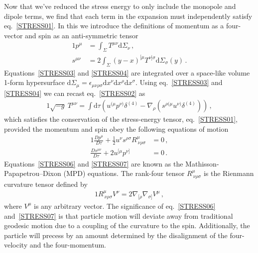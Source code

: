 Now that we've reduced the stress energy to only include the monopole and dipole terms, we find that each term in the expansion must independently satisfy eq.~\eqref{STRESS01}. In this we introduce the definitions of momentum as a four-vector and spin as an anti-symmetric tensor
\begin{alignat}{1}
  \label{STRESS03} p^{\mu}&=\int_{\Sigma}T^{\mu\nu}\mathrm{d}\Sigma_{\nu}\,,\\
  \label{STRESS04} s^{\mu\nu}&=2\int_{\Sigma}(y-x)^{[\mu}T^{\nu]\sigma}\mathrm{d}\Sigma_{\sigma}(y)\,.
\end{alignat}
Equations~\eqref{STRESS03} and \eqref{STRESS04} are integrated over a space-like volume 1-form hypersurface $\mathrm{d}\Sigma_{\mu}=\epsilon_{\mu\nu\rho\sigma}\mathrm{d}x^{\nu}\mathrm{d}x^{\rho}\mathrm{d}x^{\sigma}$. Using eq.~\eqref{STRESS03} and \eqref{STRESS04} we can recast eq.~\eqref{STRESS02} as
\begin{alignat}{1}
  \label{STRESS05} \sqrt{-g}\ T^{\mu\nu}=\int\mathrm{d}\tau\left(u^{(\mu}p^{\nu)}\delta^{(4)}-\nabla_{\rho}\left(s^{\rho(\mu}u^{\nu)}\delta^{(4)}\right)\right)\,,
\end{alignat}
which satisfies the conservation of the stress-energy tensor, eq.~\eqref{STRESS01}, provided the momentum and spin obey the following equations of motion
\begin{alignat}{1}
  \label{STRESS06} \frac{Dp^{\mu}}{D\tau}+\frac{1}{2}u^{\nu}s^{\rho\sigma}R^{\mu}_{\ \nu\rho\sigma}&=0\,,\\
  \label{STRESS07} \frac{Ds^{\mu\nu}}{D\tau}+2u^{[\mu}p^{\nu]}&=0\,.
\end{alignat}
Equations~\eqref{STRESS06} and \eqref{STRESS07} are known as the Mathisson-Papapetrou–Dixon (MPD) equations. The rank-four tensor $R^{\mu}_{\ \nu\rho\sigma}$ is the Rienmann curvature tensor defined by
\begin{alignat}{1}
  \label{STRESS08} R^{\mu}_{\ \nu\rho\sigma}V^{\nu}=2\nabla_{[\rho}\nabla_{\sigma]}V^{\mu}\,,
\end{alignat}
where $V^{\mu}$ is any arbitrary vector. The significance of eq.~\eqref{STRESS06} and~\eqref{STRESS07} is that particle motion will deviate away from traditional geodesic motion due to a coupling of the curvature to the spin. Additionally, the particle will precess by an amount determined by the disalignment of the four-velocity and the four-momentum.
